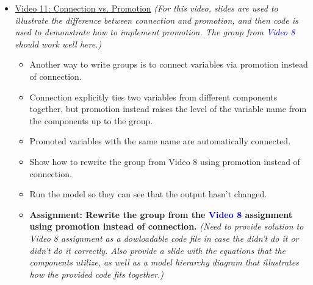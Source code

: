 \documentclass[12pt, letterpaper]{article}
\begin{document}
\begin{itemize}
	\item \underline{Video 11: Connection vs. Promotion} \textit{(For this video, slides are used to illustrate the difference between connection and promotion, and then code is used to demonstrate how to implement promotion. The group from \textcolor{blue}{Video 8} should work well here.)}
		\begin{itemize}
			\item Another way to write groups is to connect variables via promotion instead of connection.
			\item Connection explicitly ties two variables from different components together, but promotion instead raises the level of the variable name from the components up to the group.
			\item Promoted variables with the same name are automatically connected.
			\item Show how to rewrite the group from Video 8 using promotion instead of connection.
			\item Run the model so they can see that the output hasn't changed.
			\item \textbf{Assignment: Rewrite the group from the \textcolor{blue}{Video 8} assignment using promotion instead of connection.} \textit{(Need to provide solution to Video 8 assignment as a dowloadable code file in case the didn't do it or didn't do it correctly. Also provide a slide with the equations that the components utilize, as well as a model hierarchy diagram that illustrates how the provided code fits together.)}
		\end{itemize}
		

\end{itemize}
\end{document}

